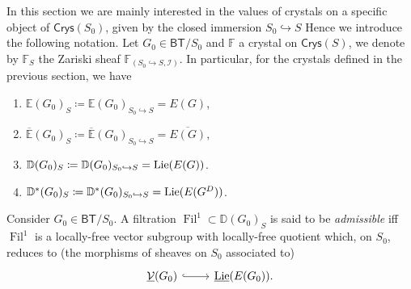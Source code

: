 \begin{ntt}[]\label{CrystalAssociatedZarSheafS}
	In this section we are mainly interested in the values of
	crystals on a specific object of $\mathsf{Crys}(S_0)$, given
	by the closed immersion $S_0 \hookrightarrow S$
	Hence we introduce the following notation.
	Let $G_0 \in \mathsf{BT}/S_0$ and $\mathbb{F}$ a crystal on $\mathsf{Crys}(S)$,
	we denote by $\mathbb{F}_S$ the Zariski sheaf
	$\mathbb{F}_{\left(S_0 \hookrightarrow S, \mathcal{I}\right)}$.
	In particular, for the crystals defined in the previous section, we have
\begin{enumerate}
	\item $\mathbb{E}(G_0)_S \coloneqq \mathbb{E}(G_0)_{S_0 \hookrightarrow S} = E(G)$,
	\item $\overline{\mathbb{E}}(G_0)_S \coloneqq \overline{\mathbb{E}}(G_0)_{S_0 \hookrightarrow S} = 
		\overline{E(G)}$,
	\item $\mathbb{D}(G_0)_S \coloneqq \mathbb{D}(G_0)_{S_0 \hookrightarrow S} = 
		\operatorname{Lie}(E(G))$.
	\item $\mathbb{D}^*(G_0)_S \coloneqq \mathbb{D}^*(G_0)_{S_0 \hookrightarrow S} = 
		\operatorname{Lie}(E(G^D))$.
\end{enumerate}
\end{ntt}


\begin{defn}
	Consider $G_0 \in \mathsf{BT}/S_0$.
	A filtration $\operatorname{Fil}^1 \subset \mathbb{D}(G_0)_S$ is said to be
	\emph{admissible} iff $\operatorname{Fil}^1$ is a locally-free vector subgroup
	with locally-free quotient which, on $S_0$, reduces to
	(the morphisms of sheaves on $S_0$ associated to)
	\begin{equation*}
	\begin{tikzcd}[row sep = 0ex
		,/tikz/column 1/.append style={anchor=base east}
		,/tikz/column 2/.append style={anchor=base west}]
		\underline{\mathcal{V}}(G_0) \arrow[r, "", hookrightarrow] &
		\underline{\lie}(E(G_0))
	.\end{tikzcd}
	\end{equation*} 
\end{defn}


